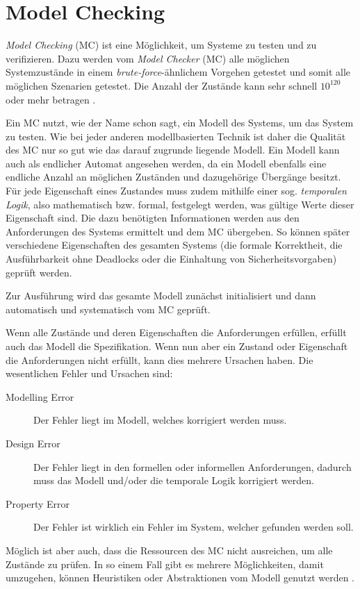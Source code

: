 \section{Model Checking}\label{sec:modelchecking}

\emph{Model Checking} (MC) ist eine Möglichkeit, um Systeme zu testen und zu verifizieren. Dazu werden vom \emph{Model Checker} (MC) alle möglichen Systemzustände in einem \emph{brute-force}-ähnlichem Vorgehen getestet und somit alle möglichen Szenarien getestet. Die Anzahl der Zustände kann sehr schnell $ 10^{120} $ oder mehr betragen \cite{Grumberg1999,Baier2008}.


Ein MC nutzt, wie der Name schon sagt, ein Modell des Systems, um das System zu testen. Wie bei jeder anderen modellbasierten Technik ist daher die Qualität des MC nur so gut wie das darauf zugrunde liegende Modell. Ein Modell kann auch als endlicher Automat angesehen werden, da ein Modell ebenfalls eine endliche Anzahl an möglichen Zuständen und dazugehörige Übergänge besitzt. Für jede Eigenschaft eines Zustandes muss zudem mithilfe einer sog. \emph{temporalen Logik}, also mathematisch bzw. formal, festgelegt werden, was gültige Werte dieser Eigenschaft sind. Die dazu benötigten Informationen werden aus den Anforderungen des Systems ermittelt und dem MC übergeben. So können später verschiedene Eigenschaften des gesamten Systems (\zB die formale Korrektheit, die Ausführbarkeit ohne Deadlocks oder die Einhaltung von Sicherheitsvorgaben) geprüft werden.

Zur Ausführung wird das gesamte Modell zunächst initialisiert und dann automatisch und systematisch vom MC geprüft.

Wenn alle Zustände und deren Eigenschaften die Anforderungen erfüllen, erfüllt auch das Modell die Spezifikation. Wenn nun aber ein Zustand oder Eigenschaft die Anforderungen nicht erfüllt, kann dies mehrere Ursachen haben. Die wesentlichen Fehler und Ursachen sind:

\begin{description}
	\item[Modelling Error] Der Fehler liegt im Modell, welches korrigiert werden muss.
	\item[Design Error] Der Fehler liegt in den formellen oder informellen Anforderungen, dadurch muss das Modell und/oder die temporale Logik korrigiert werden.
	\item[Property Error] Der Fehler ist wirklich ein Fehler im System, welcher gefunden werden soll.
\end{description}

Möglich ist aber auch, dass die Ressourcen des MC nicht ausreichen, um alle Zustände zu prüfen. In so einem Fall gibt es mehrere Möglichkeiten, damit umzugehen, \zB können Heuristiken oder Abstraktionen vom Modell genutzt werden \cite{Leucker2008,Eberhardinger2016}.
